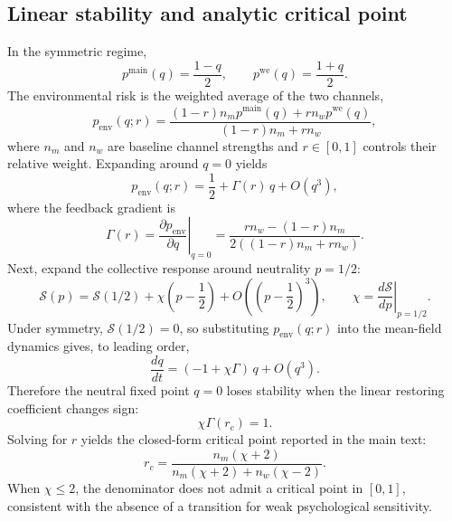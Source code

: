 \documentclass[11pt]{article}
\begin{document}
\subsection{Linear stability and analytic critical point}

In the symmetric regime,
\begin{equation}
p^{\text{main}}(q)=\frac{1-q}{2},\qquad p^{\text{we}}(q)=\frac{1+q}{2}.
\end{equation}
The environmental risk is the weighted average of the two channels,
\begin{equation}
p_{\text{env}}(q;r)=\frac{(1-r)n_m p^{\text{main}}(q)+r n_w p^{\text{we}}(q)}{(1-r)n_m+r n_w},
\end{equation}
where $n_m$ and $n_w$ are baseline channel strengths and $r\in[0,1]$ controls their relative weight. Expanding around $q=0$ yields
\begin{equation}
p_{\text{env}}(q;r)=\frac{1}{2}+\Gamma(r)\,q+O(q^3),
\end{equation}
where the feedback gradient is
\begin{equation}
\Gamma(r)=\left.\frac{\partial p_{\text{env}}}{\partial q}\right|_{q=0}
=\frac{r n_w-(1-r)n_m}{2\left((1-r)n_m+r n_w\right)}.
\end{equation}
Next, expand the collective response around neutrality $p=1/2$:
\begin{equation}
\mathcal{S}(p)=\mathcal{S}(1/2)+\chi\left(p-\frac{1}{2}\right)+O\!\left(\left(p-\frac{1}{2}\right)^3\right),\qquad
\chi=\left.\frac{d\mathcal{S}}{dp}\right|_{p=1/2}.
\end{equation}
Under symmetry, $\mathcal{S}(1/2)=0$, so substituting $p_{\text{env}}(q;r)$ into the mean-field dynamics gives, to leading order,
\begin{equation}
\frac{dq}{dt}=(-1+\chi\Gamma)\,q+O(q^3).
\end{equation}
Therefore the neutral fixed point $q=0$ loses stability when the linear restoring coefficient changes sign:
\begin{equation}
\chi\Gamma(r_c)=1.
\end{equation}
Solving for $r$ yields the closed-form critical point reported in the main text:
\begin{equation}
r_c=\frac{n_m(\chi+2)}{n_m(\chi+2)+n_w(\chi-2)}.
\end{equation}
When $\chi\le 2$, the denominator does not admit a critical point in $[0,1]$, consistent with the absence of a transition for weak psychological sensitivity.
\end{document}
